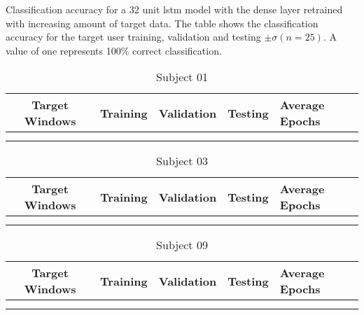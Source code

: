 \begin{table}[H]
    \centering
    \caption[Classification accuracy for a 32 unit  model with the dense layer retrained with increasing amount of target data]{Classification accuracy for a 32 unit \acrshort{lstm} model with the dense layer retrained  with increasing amount of target data. The table shows the classification accuracy for the target user training, validation and testing $\pm\sigma (n=25)$. A value of one represents 100\% correct classification.}
    \label{tab:classifcation_performance_frozen-lstm-layer}
    \begin{subtable}{\textwidth}
    \caption{Subject 01}
    \begin{tabularx}{\textwidth}{cYYYY}
        Target Windows & Training & Validation & Testing & Average Epochs \\
        \hline
        \\
          \\
    \end{tabularx}
    \end{subtable}
\end{table}
\begin{table}[H]\ContinuedFloat
    \centering
    \begin{subtable}{\textwidth}
    \caption{Subject 03}
    \begin{tabularx}{\textwidth}{cYYYY}
        Target Windows & Training & Validation & Testing & Average Epochs \\
        \hline
        \\
         \\
    \end{tabularx}
    \end{subtable}
\end{table}
\begin{table}[H]\ContinuedFloat
    \centering
    \begin{subtable}{\textwidth}
    \caption{Subject 09}
    \begin{tabularx}{\textwidth}{cYYYY}
        Target Windows & Training & Validation & Testing & Average Epochs \\
        \hline
        \\
         \\
    \end{tabularx}
    \end{subtable}
\end{table}

